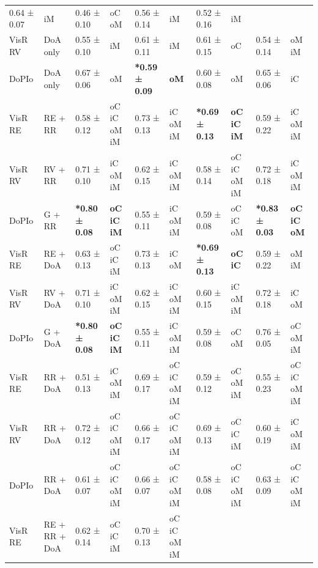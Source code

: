 \begin{landscape}
\begin{longtable}{
        p{0.50in} 
        p{0.90in} | 
        w{r}{0.70in} w{l}{0.75in} | 
        w{r}{0.70in} w{l}{0.75in} | 
        w{r}{0.70in} w{l}{0.75in} | 
        w{r}{0.70in} w{l}{0.75in}}
        0.64 ± 0.07 & iM &
        0.46 ± 0.10 & oC oM &
        0.56 ± 0.14 & iM &
        0.52 ± 0.16 & iM \\
        VisR RV & DoA only &
        0.55 ± 0.10 & iM &
        0.61 ± 0.11 & iM &
        0.61 ± 0.15 & oC &
        0.54 ± 0.14 & oM iM \\
        DoPIo & DoA only &
        0.67 ± 0.06 & oM &
        \textbf{*0.59 ± 0.09} & \textbf{oM} &
        0.60 ± 0.08 & oM &
        0.65 ± 0.06 & iC \\ 
        \midrule
        VisR RE & RE + RR &
        0.58 ± 0.12 & oC iC oM iM &
        0.73 ± 0.13 & iC oM iM &
        \textbf{*0.69 ± 0.13} & \textbf{oC iC iM} &
        0.59 ± 0.22 & iC oM iM \\
        VisR RV & RV + RR &
        0.71 ± 0.10 & iC oM iM &
        0.62 ± 0.15 & iC oM iM &
        0.58 ± 0.14 & oC iC oM iM &
        0.72 ± 0.18 & iC oM iM \\
        DoPIo & G + RR &
        \textbf{*0.80 ± 0.08} & \textbf{oC iC iM} &
        0.55 ± 0.11 & iC oM iM &
        0.59 ± 0.08 & oC iC oM &
        \textbf{*0.83 ± 0.03} & \textbf{oC iC oM} \\ 
        \midrule
        VisR RE & RE + DoA &
        0.63 ± 0.13 & oC iC iM &
        0.73 ± 0.13 & iC oM &
        \textbf{*0.69 ± 0.13} & \textbf{oC iC} &
        0.59 ± 0.22 & oM iM \\
        VisR RV & RV + DoA &
        0.71 ± 0.10 & iC oM iM &
        0.62 ± 0.15 & iC oM iM &
        0.60 ± 0.15 & iC oM iM &
        0.72 ± 0.18 & iC oM \\
        DoPIo & G + DoA &
        \textbf{*0.80 ± 0.08} & \textbf{oC iC iM} &
        0.55 ± 0.11 & iC oM iM &
        0.59 ± 0.08 & oC oM &
        0.76 ± 0.05 & oC oM iM \\ 
        \midrule
        VisR RE & RR + DoA &
        0.51 ± 0.13 & iC oM iM &
        0.69 ± 0.17 & oC iC oM iM &
        0.59 ± 0.12 & oC oM iM &
        0.55 ± 0.23 & oC iC oM iM \\
        VisR RV & RR + DoA &
        0.72 ± 0.12 & oC iC oM iM &
        0.66 ± 0.17 & oC iC oM iM &
        0.69 ± 0.13 & oC iC iM &
        0.60 ± 0.19 & iC oM iM \\
        DoPIo & RR + DoA &
        0.61 ± 0.07 & oC iC oM iM &
        0.66 ± 0.07 & oC iC oM iM &
        0.58 ± 0.08 & oC iC oM iM &
        0.63 ± 0.09 & oC iC oM iM \\ 
        \midrule
        VisR RE & RE + RR + DoA &
        0.62 ± 0.14 & oC iC iM &
        0.70 ± 0.13 & oC iC oM iM &

\end{longtable}
\end{landscape}
